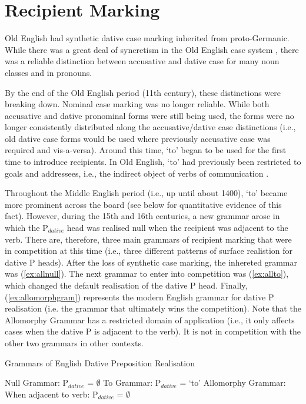 \section{Recipient Marking}
	Old English had synthetic dative case marking inherited from proto-Germanic. While there was a great deal of syncretism in the Old English case system \citep{Allen.1999}, there was a reliable distinction between accusative and dative case for many noun classes and in pronouns.

	By the end of the Old English period (11th century), these distinctions were breaking down. Nominal case marking was no longer reliable. While both accusative and dative pronominal forms were still being used, the forms were no longer consistently distributed along the accusative/dative case distinctions (i.e., old dative case forms would be used where previously accusative case was required and vis-a-versa). Around this time, `to' began to be used for the first time to introduce recipients. In Old English, `to' had previously been restricted to goals and addressees, i.e., the indirect object of verbs of communication \citep{Allen.1999,McFadden.2002,OED.2013}. 

	Throughout the Middle English period (i.e., up until about 1400), `to' became more prominent across the board (see below for quantitative evidence of this fact). However, during the 15th and 16th centuries, a new grammar arose in which the P$_{dative}$ head was realised null when the recipient was adjacent to the verb. There are, therefore, three main grammars of recipient marking that were in competition at this time (i.e., three different patterns of surface realistion for dative P heads). After the loss of synthetic case marking, the inhereted grammar was (\ref{ex:allnull}). The next grammar to enter into competition was (\ref{ex:allto}), which changed the default realisation of the dative P head. Finally, (\ref{ex:allomorphgram}) represents the modern English grammar for dative P realisation (i.e. the grammar that ultimately wins the competition). Note that the Allomorphy Grammar has a restricted domain of application (i.e., it only affects cases when the dative P is adjacent to the verb). It is not in competition with the other two grammars in other contexts.

	\begin{exe}
		\ex Grammars of English Dative Preposition Realisation
		\begin{xlist}
			\ex Null Grammar: P$_{dative}$ = $\emptyset$ \label{ex:allnull}
			\ex To Grammar: P$_{dative}$ = `to' \label{ex:allto}
			\ex Allomorphy Grammar: When adjacent to verb: P$_{dative}$ = $\emptyset$\label{ex:allomorphgram}
		\end{xlist}
	\end{exe}

